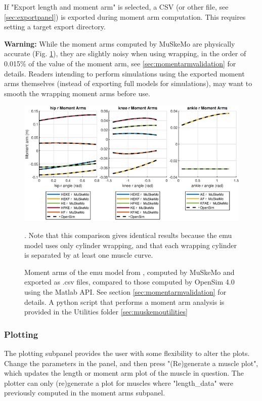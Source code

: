 \documentclass{article}
\begin{document}
If "Export length and moment arm" is selected, a CSV (or other file, see \ref{sec:exportpanel}) is exported during moment arm computation. This requires setting a target export directory.

\textbf{Warning:} While the moment arms computed by MuSkeMo are physically accurate (Fig. \ref{fig:momentarmscombined}), they are slightly noisy when using wrapping, in the order of 0.015\% of the value of the moment arm, see \ref{sec:momentarmvalidation} for details. Readers intending to perform simulations using the exported moment arms themselves (instead of exporting full models for simulations), may want to smooth the wrapping moment arms before use.

\begin{figure}[htb]
    \centering
    \includegraphics[width=1\textwidth]{figures/HKA_momentarms_emu.eps} %
    \caption{Moment arms of the emu model from \cite{vanbijlertMusclecontrolledPhysicsSimulations2024a}, computed by MuSkeMo and exported as .csv files, compared to those computed by OpenSim 4.0 using the Matlab API. See section \ref{sec:momentarmvalidation} for details. A python script that performs a moment arm analysis is provided in the Utilities folder \ref{sec:muskemoutilities}}. Note that this comparison gives identical results because the emu model uses only cylinder wrapping, and that each wrapping cylinder is separated by at least one muscle curve.
    \label{fig:momentarmscombined}
\end{figure}


\subsubsection{Plotting}
\label{sec:plotting}

The plotting subpanel provides the user with some flexibility to alter the plots. Change the parameters in the panel, and then press "(Re)generate a muscle plot", which updates the length or moment arm plot of the muscle in question. The plotter can only (re)generate a plot for muscles where "length\_data" were previously computed in the moment arms subpanel.
\end{document}
